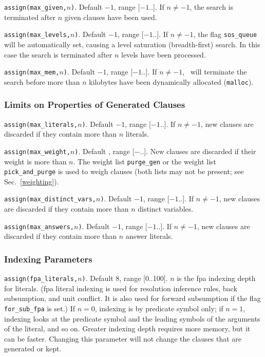\documentclass[11pt]{article}
\begin{document}
\noindent
\verb:assign(max_given,:$n$\verb:):.  Default $-1$, range [$-1$..\maxint ].  If $n\neq -1$,
the search is terminated after $n$ given clauses have been
used.

\noindent
\verb:assign(max_levels,:$n$\verb:):.  Default $-1$, range [$-1$..\maxint ].  If $n\neq -1$,
the flag \verb:sos_queue: will be automatically set, causing a level saturation
(breadth-first) search.  In this case the search is terminated after $n$ levels
have been processed.

\noindent
\verb:assign(max_mem,:$n$\verb:):.  Default $-1$, range [$-1$..\maxint ].  If $n\neq -1$,
\otter\ will terminate the search before more than $n$
kilobytes have been dynamically allocated (\verb:malloc:).

\subsubsection{Limits on Properties of Generated Clauses}

\verb:assign(max_literals,:$n$\verb:):.  Default $-1$, range [$-1$..\maxint ].  If $n\neq -1$,
new clauses are discarded if they contain more than $n$
literals.

\noindent
\verb:assign(max_weight,:$n$\verb:):.  Default \maxint, range [$-$\maxint ..\maxint ].
New clauses are discarded if their weight is more than
$n$.  The weight list \verb:purge_gen: or the weight list
\verb:pick_and_purge: is used to weigh clauses (both lists may not be
present; see Sec.~\ref{weighting}).

\noindent
\verb:assign(max_distinct_vars,:$n$\verb:):.  Default $-1$, range [$-1$..\maxint ].
If $n\neq -1$,
new clauses are discarded if they contain more than $n$
distinct variables.

\noindent
\verb:assign(max_answers,:$n$\verb:):.  Default $-1$, range [$-1$..\maxint ].
If $n\neq -1$,
new clauses are discarded if they contain more than $n$
answer literals.

\subsubsection{Indexing Parameters}

\verb:assign(fpa_literals,:$n$\verb:):.  Default 8, range [0..100].  $n$ is the {\sc fpa}
indexing depth for literals.  ({\sc fpa} literal indexing is used for
resolution inference rules, back subsumption, and unit conflict.  It
is also used for forward subsumption if the flag \verb:for_sub_fpa:
is set.)  If $n=0$, indexing is by predicate symbol only; if $n=1$,
indexing looks at the predicate symbol and the leading symbols of the
arguments of the literal, and so on.  Greater indexing depth requires
more memory, but it can be faster.  Changing this parameter will not
change the clauses that are generated or kept.
\end{document}
